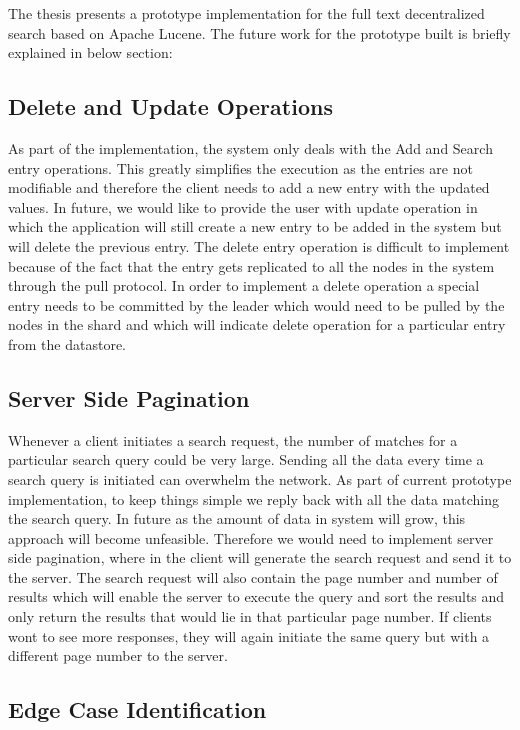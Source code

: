 \documentclass[12pt,a4paper,twoside,openright]{book}
\begin{document}
The thesis presents a prototype implementation for the full text decentralized search based on Apache Lucene. The future work for the prototype built is briefly explained in below section:


\subsection{Delete and Update Operations}

As part of the implementation, the system only deals with the Add and Search entry operations. This greatly simplifies the execution as the entries are not modifiable and therefore the client needs to add a new entry with the updated values. In future, we would like to provide the user with update operation in which the application will still create a new entry to be added in the system but will delete the previous entry. The delete entry operation is difficult to implement because of the fact that the entry gets replicated to all the nodes in the system through the pull protocol. In order to implement a delete operation a special entry needs to be committed by the leader which would need to be pulled by the nodes in the shard and which will indicate delete operation for a particular entry from the datastore.

\subsection{Server Side Pagination}

Whenever a client initiates a search request, the number of matches for a particular search query could be very large. Sending all the data every time a search query is initiated can overwhelm the network. As part of current prototype implementation, to keep things simple we reply back with all the data matching the search query. In future as the amount of data in system will grow, this approach will become unfeasible. Therefore we would need to implement server side pagination, where in the client will generate the search request and send it to the server. The search request will also contain the page number and number of results which will enable the server to execute the query and sort the results and only return the results that would lie in that particular page number. If clients wont to see more responses, they will again initiate the same query but with a different page number to the server.


\subsection{Edge Case Identification}
\end{document}
